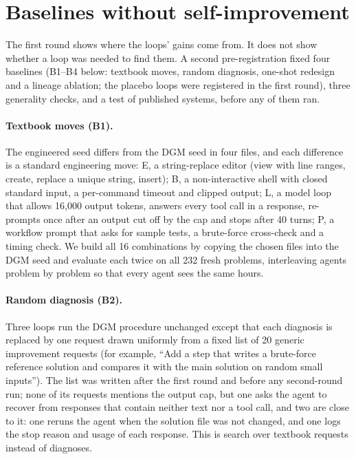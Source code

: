 \section{Baselines without self-improvement}\label{sec:round2}
The first round shows where the loops' gains come from. It does not show whether a loop was needed to find them. A
second pre-registration fixed four baselines (B1--B4 below: textbook moves, random diagnosis, one-shot redesign and a
lineage ablation; the placebo loops were registered in the first round), three generality checks,
and a test of published systems, before any of them ran.

\paragraph{Textbook moves (B1).} The engineered seed differs from the DGM seed in four files, and each difference is a
standard engineering move: E, a string-replace editor (view with line ranges, create, replace a unique string, insert);
B, a non-interactive shell with closed standard input, a per-command timeout and clipped output; L, a model loop that
allows 16{,}000 output tokens, answers every tool call in a response, re-prompts once after an output cut off by the
cap and stops after 40 turns; P, a workflow prompt that asks for sample tests, a brute-force cross-check and a timing
check. We build all 16 combinations by copying the chosen files into the DGM seed and evaluate each twice on all 232
fresh problems, interleaving agents problem by problem so that every agent sees the same hours.

\paragraph{Random diagnosis (B2).} Three loops run the DGM procedure unchanged except that each diagnosis is replaced by
one request drawn uniformly from a fixed list of 20 generic improvement requests (for example, ``Add a step that writes
a brute-force reference solution and compares it with the main solution on random small inputs''). The list was written
after the first round and before any second-round run; none of its requests mentions the output cap, but one asks the
agent to recover from responses that contain neither text nor a tool call, and two are close to it: one reruns the
agent when the solution file was not changed, and one logs the stop reason and usage of each response. This is search over textbook requests
instead of diagnoses.

